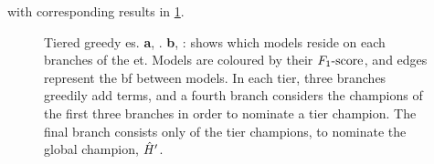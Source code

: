 with corresponding results in \cref{fig:example_es_tiered_greedy}. 
\begin{figure}[H]
    \begin{center}
    \qquad
    \end{center}
    \caption[Tiered greedy exploration strategy]{
        Tiered greedy \acrlong{es}. 
        \textbf{a}, . 
        \textbf{b}, : shows which models reside on each branches of the \acrlong{et}. 
        Models are coloured by their $ F_{1}\text{-score} $, and edges represent the \gls{bf} between models. 
        In each tier, three branches greedily add terms, and a fourth branch considers the champions of the first three branches
        in order to nominate a tier champion. 
        The final branch consists only of the tier champions, to nominate the global champion, $\hat{H}^{\prime}$.  
    }
    \label{fig:example_es_tiered_greedy}
\end{figure}

